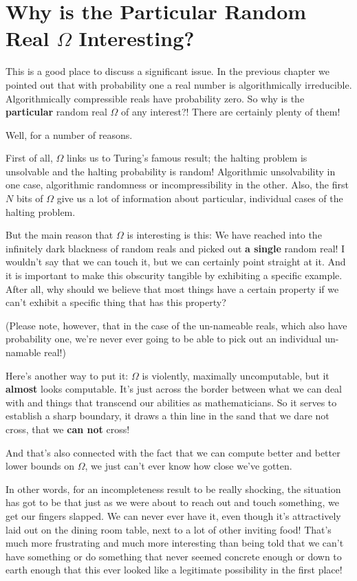 \documentclass[12pt]{book}
\begin{document}
\section*{Why is the Particular Random Real $\Omega$ Interesting?}

This is a good place to discuss a significant issue.  In the previous
chapter we pointed out that with probability one a real number is
algorithmically irreducible.  
Algorithmically compressible reals have probability zero.
So why is the \textbf{particular} random real 
$\Omega$ of any interest?! There are certainly plenty of them!
 
Well, for a number of reasons.
 
First of all, $\Omega$ links us to Turing's famous result; the halting 
problem is unsolvable and the halting probability is random!
Algorithmic unsolvability in one case, algorithmic randomness or incompressibility in the other.
Also, the first $N$ bits of $\Omega$ give us a lot of information about
particular, individual cases of the halting problem.
 
But the main reason that $\Omega$ is interesting is this:
We have reached into the infinitely dark blackness of random reals
and picked out \textbf{a single} random real!  I wouldn't say that
we can touch it, but we can certainly point straight at it.
And it is important to make this obscurity tangible by exhibiting a
specific example.
After all, why should we believe that most things have a certain property
if we can't exhibit a specific thing that has this property?
 
(Please note, however, that 
in the case of the un-nameable reals, 
which also have probability one, we're never ever going to be able to
pick out an individual un-namable real!)
 
Here's another way to put it:
$\Omega$ is violently, maximally uncomputable, but it \textbf{almost} looks
computable.  It's just across the border between what we can deal with
and things that transcend our abilities as mathematicians.  So it serves
to establish a sharp boundary, it draws a thin line in the sand that we dare not
cross, that we \textbf{can not} cross!
 
And that's also connected with the fact that we can compute better and better
lower bounds on $\Omega$, we just can't ever know how close we've gotten.
 
In other words, for an incompleteness result to be really shocking, the
situation has got to be that just as we were about to reach out and touch something,
we get our fingers slapped. We can never ever have it, even though it's attractively
laid out on the dining room table, next to a lot of other inviting food!
That's much more frustrating and much more interesting than being told
that we can't have something or do something that never seemed concrete enough
or down to earth enough that this ever looked like a legitimate possibility in the first place!
\end{document}
